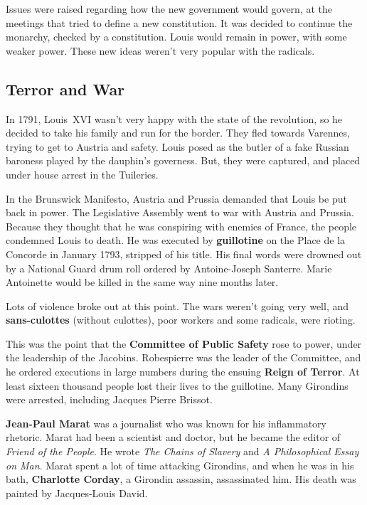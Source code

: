 Issues were raised regarding how the new government would govern,
at the meetings that tried to define a new constitution.
It was decided to continue the monarchy, checked by a constitution.
Louis would remain in power, with some weaker power.
These new ideas weren't very popular with the radicals.

\subsection*{Terror and War}

In 1791, Louis~XVI wasn't very happy with the state of the revolution,
so he decided to take his family and run for the border.
They fled towards Varennes, trying to get to Austria and safety.
Louis posed as the butler of a fake Russian baroness played by the dauphin's governess.
But, they were captured, and placed under house arrest in the Tuileries.

In the Brunswick Manifesto, Austria and Prussia demanded that Louis be put back in power.
The Legislative Assembly went to war with Austria and Prussia.
Because they thought that he was conspiring with enemies of France, the people condemned Louis to death.
He was executed by \textbf{guillotine} on the Place de la Concorde in January 1793, stripped of his title.
His final words were drowned out by a National Guard drum roll ordered by Antoine-Joseph Santerre.
Marie Antoinette would be killed in the same way nine months later.


Lots of violence broke out at this point.
The wars weren't going very well, and \textbf{sans-culottes} (without culottes),
poor workers and some radicals, were rioting.

This was the point that the \textbf{Committee of Public Safety} rose to power,
under the leadership of the Jacobins.
Robespierre was the leader of the Committee,
and he ordered executions in large numbers during the ensuing \textbf{Reign of Terror}.
At least sixteen thousand people lost their lives to the guillotine.
Many Girondins were arrested, including Jacques Pierre Brissot.

\textbf{Jean-Paul Marat} was a journalist who was known for his inflammatory rhetoric.
Marat had been a scientist and doctor, but he became the editor of \textit{Friend of the People}.
He wrote \textit{The Chains of Slavery} and \textit{A Philosophical Essay on Man}.
Marat spent a lot of time attacking Girondins, and when he was in his bath,
\textbf{Charlotte Corday}, a Girondin assassin, assassinated him.
His death was painted by Jacques-Louis David.

